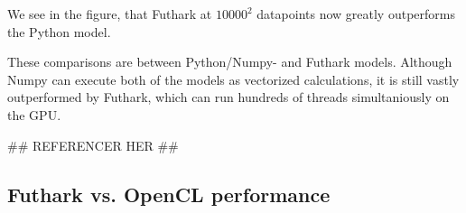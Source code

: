 \documentclass[11pt]{article}
\begin{document}
We see in the figure, that Futhark at $10000^2$ datapoints now greatly outperforms
the Python model.

\begin{mdframed}[
  frametitle={Why does Futhark perform faster than Python?},
  nobreak=true
  ]
These comparisons are between Python/Numpy- and Futhark models.
Although Numpy can execute both of the models as vectorized calculations, 
it is still vastly outperformed by Futhark, which can run hundreds of threads 
simultaniously on the GPU.

## REFERENCER HER ##
\end{mdframed}

\subsection{Futhark vs. OpenCL performance}
\end{document}
